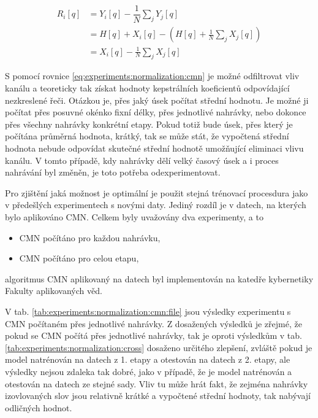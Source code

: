 \begin{align}
  R_i\left[q\right] &= Y_i\left[q\right] - \dfrac{1}{N}\sum_{j} Y_j\left[q\right] \nonumber  \\
  &= H\left[q\right] + X_i\left[q\right] - \left( H\left[q\right] + \frac{1}{N} \sum_j X_j\left[q\right] \right) \nonumber  \\
  &= X_i\left[q\right] - \frac{1}{N} \sum_j X_j\left[q\right]
  \label{eq:experiments:normalization:cmn}
\end{align}

\noindent S pomocí rovnice \ref{eq:experiments:normalization:cmn} je možné odfiltrovat vliv kanálu a teoreticky tak získat hodnoty kepstrálních koeficientů odpovídající nezkreslené řeči. Otázkou je, přes jaký úsek počítat střední hodnotu. Je možné ji počítat přes posuvné okénko fixní délky, přes jednotlivé nahrávky, nebo dokonce přes všechny nahrávky konkrétní etapy. Pokud totiž bude úsek, přes který je počítána průměrná hodnota, krátký, tak se může stát, že vypočtená střední hodnota nebude odpovídat skutečné střední hodnotě umožňující eliminaci vlivu kanálu. V tomto případě, kdy nahrávky dělí velký časový úsek a i proces nahrávání byl změněn, je toto potřeba odexperimentovat.

Pro zjištění jaká možnost je optimální je použit stejná trénovací procesdura jako v předešlých experimentech s novými daty. Jediný rozdíl je v datech, na kterých bylo aplikováno CMN. Celkem byly uvažovány dva experimenty, a to

\begin{itemize}
  \item CMN počítáno pro každou nahrávku,
  \item CMN počítáno pro celou etapu,
\end{itemize}

\noindent algoritmus CMN aplikovaný na datech byl implementován na katedře kybernetiky Fakulty aplikovaných věd.

V tab. \ref{tab:experiments:normalization:cmn:file} jsou výsledky experimentu s CMN počítaném přes jednotlivé nahrávky. Z dosažených výsledků je zřejmé, že pokud se CMN počítá přes jednotlivé nahrávky, tak je oproti výsledkům v tab. \ref{tab:experiments:normalization:cross} dosaženo určitého zlepšení, zvláště pokud je model natrénován na datech z 1. etapy a otestován na datech z 2. etapy, ale výsledky nejsou zdaleka tak dobré, jako v případě, že je model natrénován a otestován na datech ze stejné sady. Vliv tu může hrát fakt, že zejména nahrávky izovlovaných slov jsou relativně krátké a vypočtené střední hodnoty, tak nabývají odličných hodnot.

